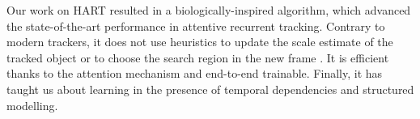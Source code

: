     
    Our work on HART resulted in a biologically-inspired algorithm, which advanced the state-of-the-art performance in attentive recurrent tracking. Contrary to modern trackers, it does not use heuristics to update the scale estimate of the tracked object or to choose the search region in the new frame \citep{Bertinetto2016,Held2016}. It is efficient thanks to the attention mechanism and end-to-end trainable. Finally, it has taught us about learning in the presence of temporal dependencies and structured modelling. 
    
%   